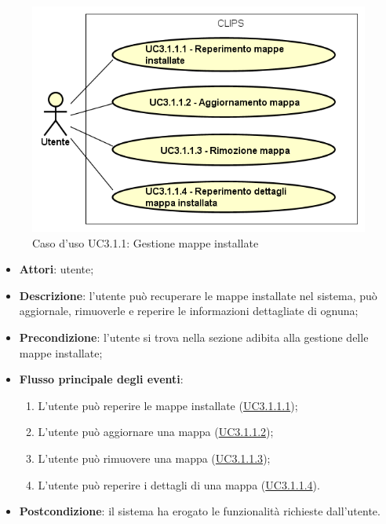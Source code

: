 \documentclass[../AnalisiDeiRequisiti.tex]{subfiles}
\begin{document}
\begin{figure}[H]
	\centering
	\includegraphics[scale=0.95, width=\textwidth]{img/UC3-1-1.png}
	\caption{Caso d'uso UC3.1.1: Gestione mappe installate}\label{fig:UC3.1.1} 
\end{figure}
\begin{itemize}
	\item \textbf{Attori}: utente;
	\item \textbf{Descrizione}: l'utente può recuperare le mappe installate nel sistema, può aggiornale, rimuoverle e reperire le informazioni dettagliate di ognuna; 
	\item \textbf{Precondizione}: l'utente si trova nella sezione adibita alla gestione delle mappe installate;
	
	\item \textbf{Flusso principale degli eventi}:
	\begin{enumerate}
		\item L'utente può reperire le mappe installate (\hyperlink{UC3.1.1.1}{UC3.1.1.1});
		\item L'utente può aggiornare una mappa (\hyperlink{UC3.1.1.2}{UC3.1.1.2});
		\item L'utente può rimuovere una mappa (\hyperlink{UC3.1.1.3}{UC3.1.1.3});
		\item L'utente può reperire i dettagli di una mappa (\hyperlink{UC3.1.1.4}{UC3.1.1.4}).
		
	\end{enumerate}
	\item \textbf{Postcondizione}: il sistema ha erogato le funzionalità richieste dall'utente.
\end{itemize}
\hypertarget{UC3.1.1.1}{}
\end{document}
